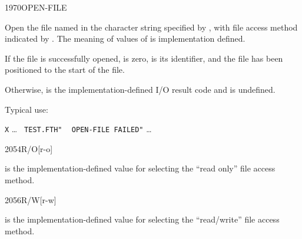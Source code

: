 \vspace*{-2ex}\enlargethispage{8ex}
\begin{worddef}{1970}{OPEN-FILE}
\item {}

	Open the file named in the character string specified by
	, with file access method indicated by
	. The meaning of values of  is
	implementation 	defined.

	If the file is successfully opened,  is zero,
	 is its identifier, and the file has been
	positioned to the start of the file.

	Otherwise,  is the implementation-defined I/O
	result code and  is undefined.

	\begin{rationale} %
		Typical use:

		\tab \word[core]{:} \texttt{X} {\ldots}
				 \texttt{ TEST.FTH"} 
				~  \texttt{OPEN-FILE FAILED"}
			{\ldots} \word[core]{;}
	\end{rationale}
\end{worddef}

\vspace*{-2ex}
\begin{worddef}{2054}{R/O}[r-o]
\item {}

	 is the implementation-defined value for selecting
	the ``read only'' file access method.

\end{worddef}

\vspace*{-2ex}
\begin{worddef}{2056}{R/W}[r-w]
\item {}

	 is the implementation-defined value for selecting
	the ``read/write'' file access method.

\end{worddef}

